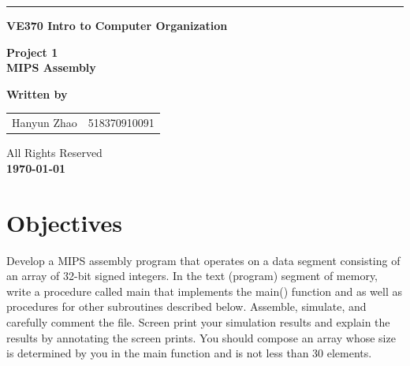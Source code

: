 \documentclass[a4paper,12pt]{article}
\begin{document}
\begin{titlepage}

\vspace*{\fill}
\noindent\rule[0.25\baselineskip]{\textwidth}{1pt}

\begin{center}

\huge{\bfseries  VE370 Intro to Computer Organization}

\vspace{0.5cm}

\Large{\bfseries  Project 1}\\
\Large{\bfseries MIPS Assembly}

\vspace{1cm}


 \textbf{Written by}\\
\begin{tabular}{l l}
Hanyun Zhao  & 518370910091\\

\end{tabular}


\vspace{2cm}

\small{\textcopyright All Rights Reserved\\
{\bfseries \today}\\}

\vspace{1cm}


\end{center}
\vspace*{\fill}
\end{titlepage}

\section{Objectives}
\par Develop a MIPS assembly program that operates on a data segment consisting of an array of 32-bit signed integers. In the text (program) segment of memory, write a procedure called main that implements the
main() function and as well as procedures for other subroutines described below. Assemble, simulate, and
carefully comment the file. Screen print your simulation results and explain the results by annotating the
screen prints. You should compose an array whose size is determined by you in the main function and is not
less than 30 elements.
\end{document}

